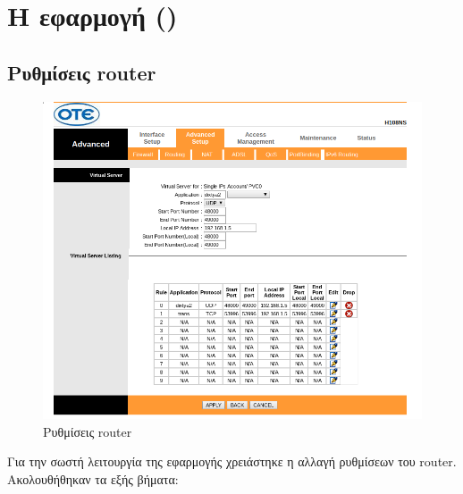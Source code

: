 \newcommand{\codeRef}[2][]{\hyperref[section:#2]{\texttt!#2#1!}}
\newcommand{\myinput}[3]{\inputminted[frame=single, breaklines=true, linenos=true, firstline=#1, lastline=#2, gobble=#3]{java}{../../src/main/java/userApplication.java}}
\chapter{Η εφαρμογή (\appname{})}
\section{Ρυθμίσεις router}
\begin{figure}[htb]
\centering
\includegraphics[width=\linewidth]{images/router}
\caption{Ρυθμίσεις router}
\label{fig:router}
\end{figure}
Για την σωστή λειτουργία της εφαρμογής \appname{} χρειάστηκε η αλλαγή ρυθμίσεων του router.
Ακολουθήθηκαν τα εξής βήματα:
